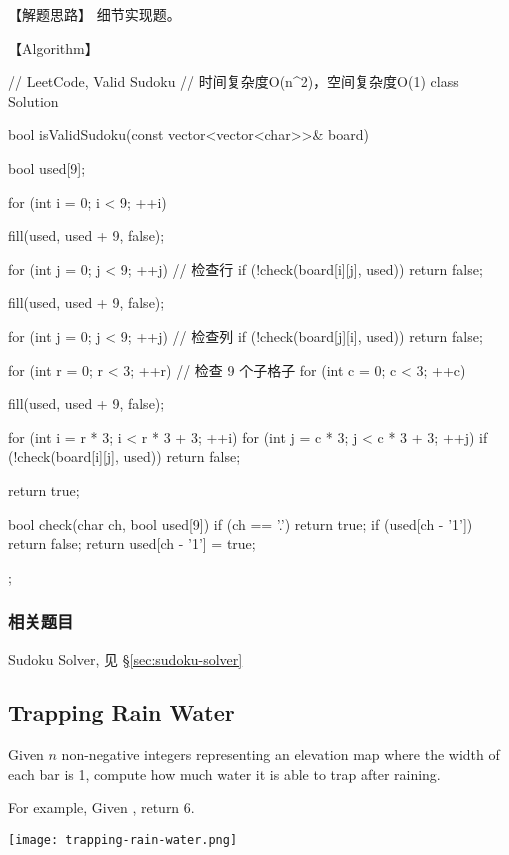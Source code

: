 【解题思路】
细节实现题。


【Algorithm】
\begin{Code}
	// LeetCode, Valid Sudoku
	// 时间复杂度O(n^2)，空间复杂度O(1)
	class Solution {
		bool isValidSudoku(const vector<vector<char>>& board) {
			bool used[9];
			
			for (int i = 0; i < 9; ++i) {
				fill(used, used + 9, false);
				
				for (int j = 0; j < 9; ++j) // 检查行
					if (!check(board[i][j], used))
						return false;
				
				fill(used, used + 9, false);
				
				for (int j = 0; j < 9; ++j) // 检查列
					if (!check(board[j][i], used))
						return false;
			}
			
			for (int r = 0; r < 3; ++r) // 检查 9 个子格子
				for (int c = 0; c < 3; ++c) {
					fill(used, used + 9, false);
				
					for (int i = r * 3; i < r * 3 + 3; ++i)
						for (int j = c * 3; j < c * 3 + 3; ++j)
							if (!check(board[i][j], used))
								return false;
				}
				return true;
		}
		
		bool check(char ch, bool used[9]) {
			if (ch == '.') return true;
			if (used[ch - '1']) return false;
			return used[ch - '1'] = true;
		}
	};
\end{Code}


\subsubsection{相关题目}
\begindot
\item Sudoku Solver, 见 \S \ref{sec:sudoku-solver}
\myenddot


\subsection{Trapping Rain Water} %
\label{sec:trapping-rain-water}



Given $n$ non-negative integers representing an elevation map where the width
of each bar is 1, compute how much water it is able to trap after raining.

For example,
Given \code{[0,1,0,2,1,0,1,3,2,1,2,1]}, return 6.

\begin{center}
	\texttt{[image: trapping-rain-water.png]}\\
	\label{fig:trapping-rain-water}
\end{center}


